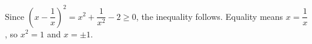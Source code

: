 Since $(x-\dfrac{1}{x})^2=x^2+\dfrac{1}{x^2}-2\ge0$, the inequality follows. Equality means $x=\dfrac{1}{x}$, so $x^2=1$ and $\boxed{x=\pm1}$.
